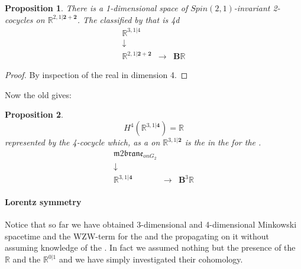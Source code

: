 \documentclass[12pt,titlepage]{article}
\newcommand{\itexarray}[1]{\begin{matrix}#1\end{matrix}}
\theoremstyle{plain}
\newtheorem{prop}{Proposition}
\theoremstyle{definition}
\theoremstyle{remark}
\begin{document}
\begin{prop}
\label{4dSuperMinkowskiSpacetime}\hypertarget{4dSuperMinkowskiSpacetime}{}
There is a 1-dimensional space of $Spin(2,1)$-invariant 2-cocycles on $\mathbb{R}^{2,1\vert \mathbf{2} + \mathbf{2}}$. The  classified by that is 4d 
\begin{displaymath}
\itexarray{
\mathbb{R}^{3,1\vert 4}
\\
\downarrow
\\
\mathbb{R}^{2,1\vert \mathbf{2}+{\mathbf{2}}}
&\longrightarrow&
\mathbf{B}\mathbb{R}
}
\end{displaymath}
\end{prop}
\begin{proof}
By inspection of the real  in dimension 4.
\end{proof}
Now the old  gives:
\begin{prop}
\label{TheStringIn4d}\hypertarget{TheStringIn4d}{}
\begin{displaymath}
H^4(\mathbb{R}^{3,1\vert \mathbf{4}}) = \mathbb{R}
\end{displaymath}
represented by the 4-cocycle which, as a   on $\mathbb{R}^{3,1\vert \mathbf{2}}$ is the  in the  for the .
\begin{displaymath}
\itexarray{
\mathfrak{m}2\mathfrak{brane}_{onG_2}
\\
\downarrow
\\
\mathbb{R}^{3,1\vert  \mathbf{4} }
&\stackrel{}{\longrightarrow}&
\mathbf{B}^3 \mathbb{R}
}
\end{displaymath}
\end{prop}
\hypertarget{lorentz_symmetry}{}\paragraph*{{Lorentz symmetry}}\label{lorentz_symmetry}
Notice that so far we have obtained 3-dimensional and 4-dimensional Minkowski spacetime and the WZW-term for the  and the  propagating on it without assuming knowledge of the . In fact we assumed nothing but the presence of the  $\mathbb{R}$ and the  $\mathbb{R}^{0|1}$ and we have simply investigated their cohomology.
\end{document}

